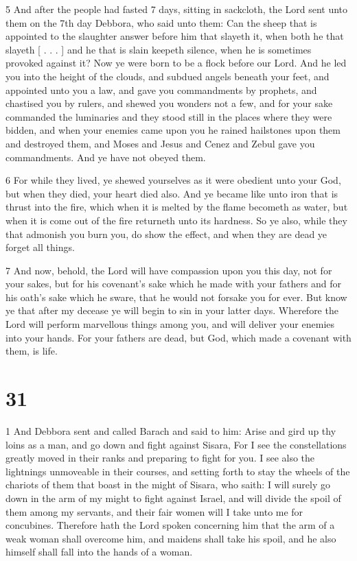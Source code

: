 \par 5 And after the people had fasted 7 days, sitting in sackcloth, the Lord sent unto them on the 7th day Debbora, who said unto them: Can the sheep that is appointed to the slaughter answer before him that slayeth it, when both he that slayeth [ . . . ] and he that is slain keepeth silence, when he is sometimes provoked against it? Now ye were born to be a flock before our Lord. And he led you into the height of the clouds, and subdued angels beneath your feet, and appointed unto you a law, and gave you commandments by prophets, and chastised you by rulers, and shewed you wonders not a few, and for your sake commanded the luminaries and they stood still in the places where they were bidden, and when your enemies came upon you he rained hailstones upon them and destroyed them, and Moses and Jesus and Cenez and Zebul gave you commandments. And ye have not obeyed them. 

\par 6 For while they lived, ye shewed yourselves as it were obedient unto your God, but when they died, your heart died also. And ye became like unto iron that is thrust into the fire, which when it is melted by the flame becometh as water, but when it is come out of the fire returneth unto its hardness. So ye also, while they that admonish you burn you, do show the effect, and when they are dead ye forget all things. 

\par 7 And now, behold, the Lord will have compassion upon you this day, not for your sakes, but for his covenant's sake which he made with your fathers and for his oath's sake which he sware, that he would not forsake you for ever. But know ye that after my decease ye will begin to sin in your latter days. Wherefore the Lord will perform marvellous things among you, and will deliver your enemies into your hands. For your fathers are dead, but God, which made a covenant with them, is life.

\chapter{31}

\par 1 And Debbora sent and called Barach and said to him: Arise and gird up thy loins as a man, and go down and fight against Sisara, For I see the constellations greatly moved in their ranks and preparing to fight for you. I see also the lightnings unmoveable in their courses, and setting forth to stay the wheels of the chariots of them that boast in the might of Sisara, who saith: I will surely go down in the arm of my might to fight against Israel, and will divide the spoil of them among my servants, and their fair women will I take unto me for concubines. Therefore hath the Lord spoken concerning him that the arm of a weak woman shall overcome him, and maidens shall take his spoil, and he also himself shall fall into the hands of a woman.

